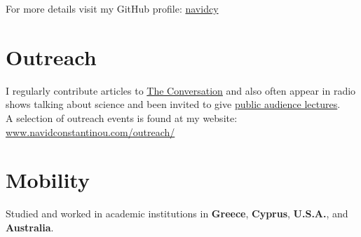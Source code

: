 \documentclass[10pt, letter]{article}
\begin{document}
For more details visit my GitHub profile: \faGithub \hspace{0.2em} \href{https://github.com/navidcy}{navidcy}\\[.2cm]


\vspace{-2em}\section*{\bf Outreach}

I regularly contribute articles to \href{https://theconversation.com/profiles/navid-constantinou-531777}{The Conversation} and also often appear in radio shows talking about science and been invited to give \href{https://atlasoflife.org.au/science-week-2021-presentations/#Navid/}{public audience lectures}. \\[.1cm]

A selection of outreach events is found at my website: \href{https://www.navidconstantinou.com/outreach/}{www.navidconstantinou.com/outreach/} \\[.2cm]


\vspace{-2em}\section*{\bf Mobility}

Studied and worked in academic institutions in \textbf{Greece}, \textbf{Cyprus}, \textbf{U.S.A.}, and \textbf{Australia}.\\[.2cm]




\end{document}
